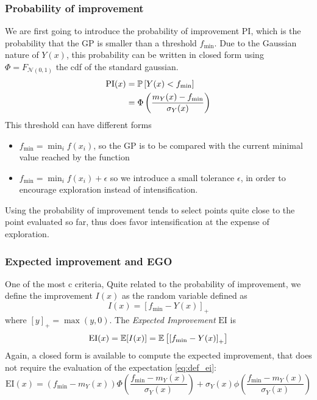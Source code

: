 \documentclass[../../Main_ManuscritThese.tex]{subfiles}
\begin{document}
\subsubsection{Probability of improvement}
We are first going to introduce the probability of improvement $\mathrm{PI}$, which is the probability that the GP is smaller than a threshold $f_{\min}$. Due to the Gaussian nature of $Y(x)$, this probability can be written in closed form using $\Phi = F_{\mathcal{N}(0, 1)}$ the cdf of the standard gaussian.
\begin{align}
  \mathrm{PI}(x) &= \Prob%
                   \left[Y(x) < f_{\min}\right] \\
                 &= \Phi\left(\frac{m_Y(x) - f_{\min}}{\sigma_Y(x)}\right)
\end{align}
This threshold can have different forms
\begin{itemize}
\item $f_{\min} = \min_{i} f(x_i)$, so the GP is to be compared with the current minimal value reached by the function
\item $f_{\min} = \min_i f(x_i) + \epsilon$ so we introduce a small tolerance $\epsilon$, in order to encourage exploration instead of intensification.
\end{itemize}
Using the probability of improvement tends to select points quite close to the point evaluated so far, thus does favor intensification at the expense of exploration.
\subsubsection{Expected improvement and EGO}
One of the most c criteria, \cite{mockus_bayesian_1974}\cite{jones_efficient_1998}
Quite related to the probability of improvement, we define the improvement $I(x)$ as the random variable defined as
\begin{equation}
  \label{eq:def_improvement}
  I(x) = {\left[f_{\min} - Y(x)\right]}_+
\end{equation}
where $[y]_+ = \max(y, 0)$.
The \emph{Expected Improvement} $\mathrm{EI}$ is 
\begin{align}
  \label{eq:def_ei}
  \mathrm{EI}(x) = \mathbb{E}[I(x)]  = \mathbb{E}\left[\left[f_{\min} - Y(x) \right]_+\right]
\end{align}
Again, a closed form is available to compute the expected improvement, that does not require the evaluation of the expectation \cref{eq:def_ei}:
\begin{equation}
  \mathrm{EI}(x) = \left(f_{\min} - m_Y(x)\right) \Phi\left(\frac{f_{\min} - m_Y(x)}{\sigma_Y(x)}\right) + \sigma_Y(x) \phi\left(\frac{f_{\min} - m_Y(x)}{\sigma_Y(x)}\right)
\end{equation}
\end{document}
